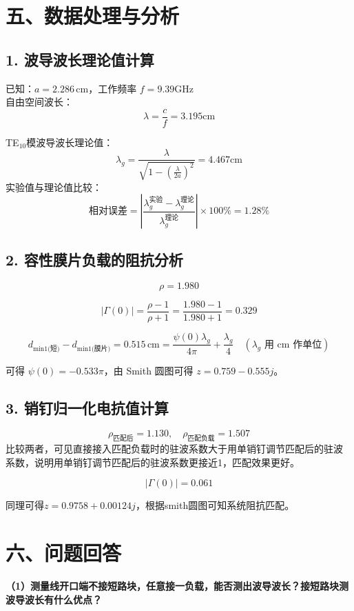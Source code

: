 \documentclass[12pt,a4paper]{article}
\begin{document}
\section*{五、数据处理与分析}

\subsection*{1. 波导波长理论值计算}
已知：$a = 2.286 \, \text{cm}$，工作频率 $f = 9.39 \text{GHz}$ \\
自由空间波长：
\[
\lambda = \frac{c}{f} = 3.195\text{cm}
\]

TE$_{10}$模波导波长理论值：
\[
\lambda_g = \frac{\lambda}{\sqrt{1 - \left(\frac{\lambda}{2a}\right)^2}} = 4.467 \text{cm}
\]
实验值与理论值比较：
\[
\text{相对误差} = \left|\frac{\lambda_g^{\text{实验}} - \lambda_g^{\text{理论}}}{\lambda_g^{\text{理论}}}\right| \times 100\% = 1.28 \%
\]
 
\subsection*{2. 容性膜片负载的阻抗分析}

\[
\rho = 1.980
\]

\[
|\Gamma(0)| = \frac{\rho - 1}{\rho + 1} = \frac{1.980 - 1}{1.980 + 1} = 0.329\] 

\[
d_{\text{min1(短)}} - d_{\text{min1(膜片)}} = 0.515\, \text{cm} = \frac{\psi(0) \lambda_g}{4\pi} + \frac{\lambda_g}{4} \quad (\lambda_g \text{ 用 cm 作单位})
\]

可得 \(\psi(0) = -0.533\pi\)，由 Smith 圆图可得 \(z = 0.759 - 0.555j\)。

\subsection*{3. 销钉归一化电抗值计算}
\[\rho_\text{{匹配后}}= 1.130, \quad \rho_{\text{匹配负载}}= 1.507\]
比较两者，可见直接接入匹配负载时的驻波系数大于用单销钉调节匹配后的驻波
系数，说明用单销钉调节匹配后的驻波系数更接近1，匹配效果更好。

\[|\Gamma(0)| =0.061\]

同理可得\(z=0.9758+0.00124j\)，根据smith圆图可知系统阻抗匹配。


\section*{六、问题回答}

\textbf{（1）测量线开口端不接短路块，任意接一负载，能否测出波导波长？接短路块测波导波长有什么优点？}
\end{document}
